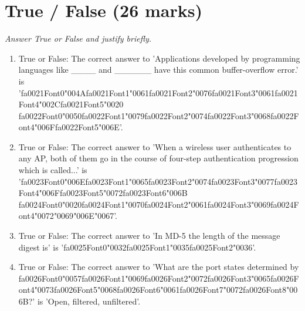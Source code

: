 \documentclass[12pt]{article}
\begin{document}
\section*{True / False (26 marks)}
\textit{Answer True or False and justify briefly.}
\begin{enumerate}[label=\arabic*.]
\item True or False: The correct answer to 'Applications developed by programming languages like \_\_\_\_ and \_\_\_\_\_\_ have this common buffer-overflow error.' is '{\csname fa0021Font0\endcsname\char"004A}{\csname fa0021Font1\endcsname\char"0061}{\csname fa0021Font2\endcsname\char"0076}{\csname fa0021Font3\endcsname\char"0061}{\csname fa0021Font4\endcsname\char"002C}{\csname fa0021Font5\endcsname\char"0020} {\csname fa0022Font0\endcsname\char"0050}{\csname fa0022Font1\endcsname\char"0079}{\csname fa0022Font2\endcsname\char"0074}{\csname fa0022Font3\endcsname\char"0068}{\csname fa0022Font4\endcsname\char"006F}{\csname fa0022Font5\endcsname\char"006E}'.
\item True or False: The correct answer to 'When a wireless user authenticates to any AP, both of them go in the course of four-step authentication progression which is called...' is '{\csname fa0023Font0\endcsname\char"006E}{\csname fa0023Font1\endcsname\char"0065}{\csname fa0023Font2\endcsname\char"0074}{\csname fa0023Font3\endcsname\char"0077}{\csname fa0023Font4\endcsname\char"006F}{\csname fa0023Font5\endcsname\char"0072}{\csname fa0023Font6\endcsname\char"006B} {\csname fa0024Font0\endcsname\char"0020}{\csname fa0024Font1\endcsname\char"0070}{\csname fa0024Font2\endcsname\char"0061}{\csname fa0024Font3\endcsname\char"0069}{\csname fa0024Font4\endcsname\char"0072}{\char"0069}{\char"006E}{\char"0067}'.
\item True or False: The correct answer to 'In MD-5 the length of the message digest is' is '{\csname fa0025Font0\endcsname\char"0032}{\csname fa0025Font1\endcsname\char"0035}{\csname fa0025Font2\endcsname\char"0036}'.
\item True or False: The correct answer to 'What are the port states determined by {\csname fa0026Font0\endcsname\char"0057}{\csname fa0026Font1\endcsname\char"0069}{\csname fa0026Font2\endcsname\char"0072}{\csname fa0026Font3\endcsname\char"0065}{\csname fa0026Font4\endcsname\char"0073}{\csname fa0026Font5\endcsname\char"0068}{\csname fa0026Font6\endcsname\char"0061}{\csname fa0026Font7\endcsname\char"0072}{\csname fa0026Font8\endcsname\char"006B}?' is 'Open, filtered, unfiltered'.

\end{enumerate}
\end{document}
